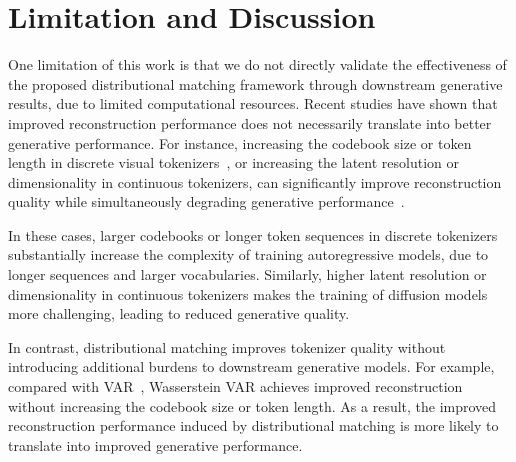 \section{Limitation and Discussion}
One limitation of this work is that we do not directly validate the effectiveness of the proposed distributional matching framework through downstream generative results, due to limited computational resources. Recent studies have shown that improved reconstruction performance does not necessarily translate into better generative performance. For instance, increasing the codebook size or token length in discrete visual tokenizers~\cite{yu2024language}, or increasing the latent resolution or dimensionality in continuous tokenizers, can significantly improve reconstruction quality while simultaneously degrading generative performance~\cite{Yao2025ReconstructionVG}. 

In these cases, larger codebooks or longer token sequences in discrete tokenizers substantially increase the complexity of training autoregressive models, due to longer sequences and larger vocabularies. Similarly, higher latent resolution or dimensionality in continuous tokenizers makes the training of diffusion models more challenging, leading to reduced generative quality. 

In contrast, distributional matching improves tokenizer quality without introducing additional burdens to downstream generative models. For example, compared with VAR~\cite{Tian2024VisualAM}, Wasserstein VAR achieves improved reconstruction without increasing the codebook size or token length. As a result, the improved reconstruction performance induced by distributional matching is more likely to translate into improved generative performance.